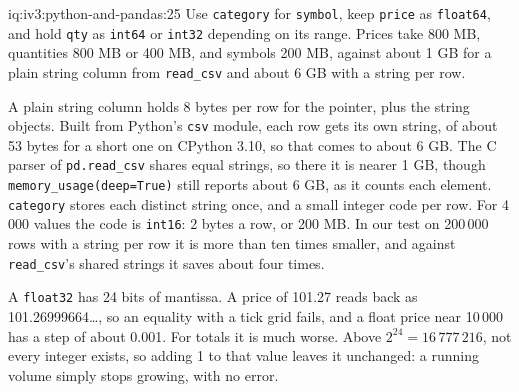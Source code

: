 \begin{solution}{iq:iv3:python-and-pandas:25}
Use \texttt{category} for \texttt{symbol}, keep \texttt{price} as \texttt{float64}, and hold \texttt{qty} as \texttt{int64} or \texttt{int32} depending on its range. Prices take 800 MB, quantities 800 MB or 400 MB, and symbols 200 MB, against about 1 GB for a plain string column from \texttt{read\_csv} and about 6 GB with a string per row.

A plain string column holds 8 bytes per row for the pointer, plus the string objects. Built from Python's \texttt{csv} module, each row gets its own string, of about 53 bytes for a short one on CPython 3.10, so that comes to about 6 GB. The C parser of \texttt{pd.read\_csv} shares equal strings, so there it is nearer 1 GB, though \texttt{memory\_usage(deep=True)} still reports about 6 GB, as it counts each element. \texttt{category} stores each distinct string once, and a small integer code per row. For 4\,000 values the code is \texttt{int16}: 2 bytes a row, or 200 MB. In our test on 200\,000 rows with a string per row it is more than ten times smaller, and against \texttt{read\_csv}'s shared strings it saves about four times.

A \texttt{float32} has 24 bits of mantissa. A price of 101.27 reads back as 101.26999664\dots, so an equality with a tick grid fails, and a float price near 10\,000 has a step of about 0.001. For totals it is much worse. Above $2^{24} = 16\,777\,216$, not every integer exists, so adding 1 to that value leaves it unchanged: a running volume simply stops growing, with no error.

\end{solution}

